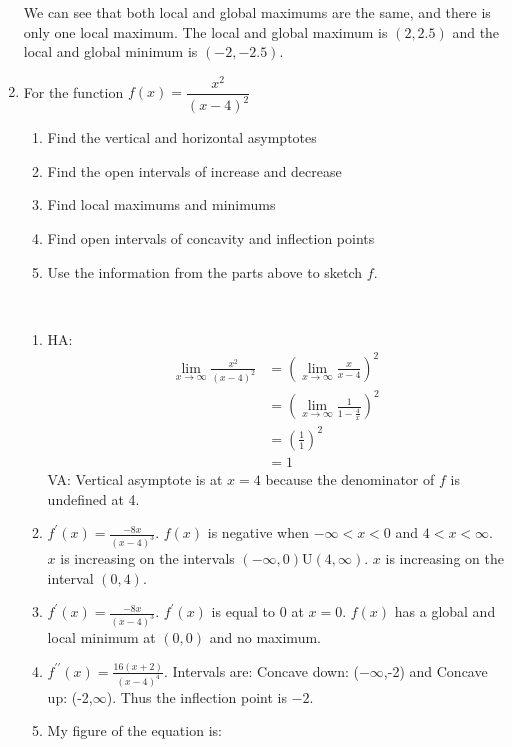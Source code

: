 \documentclass{article}
\begin{document}
\begin{enumerate}[label=\textbf{(13.\arabic*)}]
We can see that both local and global maximums are the same, and there is only one local maximum. The local and global maximum is $(2,2.5)$ and the local and global minimum is $(-2,-2.5)$.

\item For the function $f(x)=\dfrac{x^2}{(x-4)^2}$
\begin{enumerate}[label=\alph*]
\item Find the vertical and horizontal asymptotes
\item Find the open intervals of increase and decrease
\item Find local maximums and minimums
\item Find open intervals of concavity and inflection points
\item Use the information from the parts above to sketch $f$.
\end{enumerate}\
\begin{enumerate}[label=(\alph*)]
\item HA:
\begin{align*}
\lim_{x \to \infty} {\frac{x^2}{{(x-4)}^2}}&= {\left(\lim_{x\to\infty} {\frac{x}{x-4}}\right)}^2 \\
&= {\left(\lim_{x\to\infty} {\frac{1}{1-\frac{4}{x}}}\right)}^2 \\
&= {\left(\frac{1}{1}\right)}^2 \\
&= 1
\end{align*}
VA:
Vertical asymptote is at $x=4$ because the denominator of $f$ is undefined at 4.
\item $f^\prime(x)=\frac{-8x}{(x-4)^3}$. $f(x)$ is negative when $-\infty<x<0$ and $4<x<\infty$. $x$ is increasing on the intervals $(-\infty,0)\text{U}(4,\infty)$. $x$ is increasing on the interval $(0,4)$.
\item $f^\prime(x)=\frac{-8x}{(x-4)^3}$. $f^\prime(x)$ is equal to 0 at $x=0$. $f(x)$ has a global and local minimum at $(0,0)$ and no maximum.
\item $f^{\prime\prime}(x)=\frac{16(x+2)}{(x-4)^{4}}$. Intervals are: Concave down: ($-\infty$,-2) and Concave up: (-2,$\infty$). Thus the inflection point is $-2$.
\item My figure of the equation is:
 \begin{figure}[H]
\centering

\end{figure}
\end{enumerate}
\end{enumerate}
\end{document}
